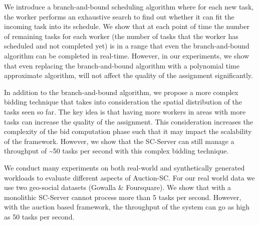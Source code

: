 We introduce a branch-and-bound scheduling algorithm where for each new task, the worker performs an exhaustive search to find out whether it can fit the incoming task into its schedule. We show that at each point of time the number of remaining tasks for each worker (the number of tasks that the worker has scheduled and not completed yet) is in a range that even the branch-and-bound algorithm can be completed in real-time. However, in our experiments, we show that even replacing the branch-and-bound algorithm with a polynomial time approximate algorithm, will not affect the quality of the assignment significantly.

In addition to the branch-and-bound algorithm, we propose a more complex bidding technique that takes into consideration the spatial distribution of the tasks seen so far. The key idea is that having more workers in areas with more tasks can increase the quality of the assignment. This consideration increases the complexity of the bid computation phase such that it may impact the scalability of the framework. However, we show that the SC-Server can still manage a throughput of \textasciitilde 50 tasks per second with this complex bidding technique.


We conduct many experiments on both real-world and synthetically generated workloads to evaluate different aspects of Auction-SC. For our real world data we use two geo-social datasets (Gowalla \& Foursquare). We show that with a monolithic SC-Server cannot process more than 5 tasks per second. However, with the auction based framework, the throughput of the system can go as high as 50 tasks per second. \\

